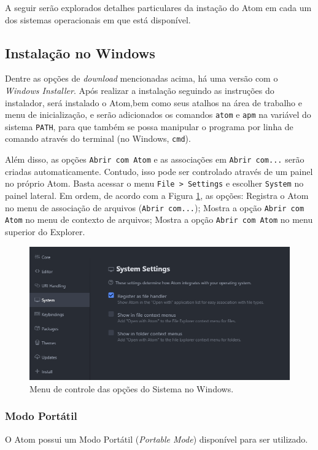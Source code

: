	A seguir serão explorados detalhes particulares da instação do Atom em cada um dos sistemas operacionais em que está disponível.

	\subsection{Instalação no Windows}\label{sec:instwin}
	Dentre as opções de \textit{download} mencionadas acima, há uma versão com o \textit{Windows Installer}. Após realizar a instalação seguindo as instruções do instalador, será instalado o Atom,bem como seus atalhos na área de trabalho e menu de inicialização, e serão adicionados os comandos \verb|atom| e \verb|apm| na variável do sistema \verb|PATH|, para que também se possa manipular o programa por linha de comando através do terminal (no Windows, \verb|cmd|).

	Além disso, as opções \verb|Abrir com Atom| e as associações em \verb|Abrir com...| serão criadas automaticamente. Contudo, isso pode ser controlado através de um painel no próprio Atom. Basta acessar o menu \verb|File > Settings| e escolher \verb|System| no painel lateral. Em ordem, de acordo com a Figura \ref{fig:fig1}, as opções: Registra o Atom no menu de associação de arquivos (\verb|Abrir com...|); Mostra a opção \verb|Abrir com Atom| no menu de contexto de arquivos; Mostra a opção \verb|Abrir com Atom| no menu superior do Explorer.

	\begin{figure}[h]
		\centering
		\label{fig:fig1}
		\includegraphics[scale = 0.7]{fig1}
		\caption{Menu de controle das opções do Sistema no Windows.}
	\end{figure}

	\subsubsection{Modo Portátil}\label{sec:portable}
	O Atom possui um Modo Portátil (\textit{Portable Mode}) disponível para ser utilizado.

